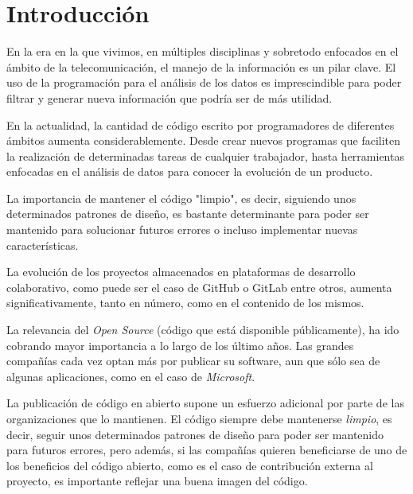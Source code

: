 \documentclass[a4paper, 12pt]{book}
\begin{document}

\cleardoublepage

\chapter{Introducción}
\label{chap:intro}

En la era en la que vivimos, en múltiples disciplinas y sobretodo enfocados en el ámbito de la telecomunicación, el manejo de la información es un pilar clave. El uso de la programación para el análisis de los datos es imprescindible para poder filtrar y generar nueva información que podría ser de más utilidad.

En la actualidad, la cantidad de código escrito por programadores de diferentes ámbitos aumenta considerablemente. Desde crear nuevos programas que faciliten la realización de determinadas tareas de cualquier trabajador, hasta herramientas enfocadas en el análisis de datos para conocer la evolución de un producto.

La importancia de mantener el código "limpio", es decir, siguiendo unos determinados patrones de diseño, es bastante determinante para poder ser mantenido para solucionar futuros errores o incluso implementar nuevas características.

La evolución de los proyectos almacenados en plataformas de desarrollo colaborativo, como puede ser el caso de GitHub o GitLab entre otros, aumenta significativamente, tanto en número, como en el contenido de los mismos.

La relevancia del \textit{Open Source} (código que está disponible públicamente), ha ido cobrando mayor importancia a lo largo de los último años. Las grandes compañías cada vez optan más por publicar su software, aun que sólo sea de algunas aplicaciones, como en el caso de \textit{Microsoft}.

La publicación de código en abierto supone un esfuerzo adicional por parte de las organizaciones que lo mantienen. El código siempre debe mantenerse \textit{limpio}, es decir, seguir unos determinados patrones de diseño para poder ser mantenido para futuros errores, pero además,  si las compañías quieren beneficiarse de uno de los beneficios del código abierto, como es el caso de contribución externa al proyecto, es importante reflejar una buena imagen del código.
\end{document}
